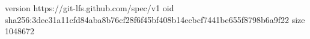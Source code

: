 version https://git-lfs.github.com/spec/v1
oid sha256:3dec31a11cfd84aba8b76cf28f6f45bf408b14ecbcf7441be655f8798b6a9f22
size 1048672
